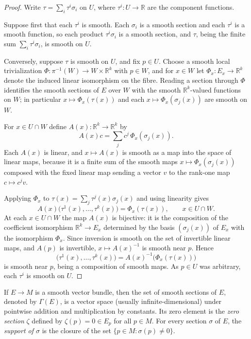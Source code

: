 \begin{proof}

Write $\tau = \sum_i \tau^i \sigma_i$ on $U$, where $\tau^i : U \to \mathbb{R}$ are the component
functions.

Suppose first that each $\tau^i$ is smooth. Each $\sigma_i$ is a smooth section and each $\tau^i$
is a smooth function, so each product $\tau^i \sigma_i$ is a smooth section, and $\tau$, being the
finite sum $\sum_i \tau^i \sigma_i$, is smooth on $U$.

Conversely, suppose $\tau$ is smooth on $U$, and fix $p \in U$. Choose a smooth local
trivialization $\Phi : \pi^{-1}(W) \to W \times \mathbb{R}^k$ with $p \in W$, and for $x \in W$ let
$\Phi_x : E_x \to \mathbb{R}^k$ denote the induced linear isomorphism on the fibre. Reading a
section through $\Phi$ identifies the smooth sections of $E$ over $W$ with the smooth
$\mathbb{R}^k$-valued functions on $W$; in particular $x \mapsto \Phi_x(\tau(x))$ and each
$x \mapsto \Phi_x(\sigma_j(x))$ are smooth on $W$.

For $x \in U \cap W$ define $A(x) : \mathbb{R}^k \to \mathbb{R}^k$ by
\[
  A(x)c = \sum_j c^j \, \Phi_x(\sigma_j(x)).
\]
Each $A(x)$ is linear, and $x \mapsto A(x)$ is smooth as a map into the space of linear maps,
because it is a finite sum of the smooth maps $x \mapsto \Phi_x(\sigma_j(x))$ composed with the
fixed linear map sending a vector $v$ to the rank-one map $c \mapsto c^j v$.

Applying $\Phi_x$ to $\tau(x) = \sum_j \tau^j(x)\sigma_j(x)$ and using linearity gives
\[
  A(x)\bigl(\tau^1(x), \ldots, \tau^k(x)\bigr) = \Phi_x(\tau(x)), \qquad x \in U \cap W .
\]
At each $x \in U \cap W$ the map $A(x)$ is bijective: it is the composition of the coefficient
isomorphism $\mathbb{R}^k \to E_x$ determined by the basis $(\sigma_j(x))$ of $E_x$ with the
isomorphism $\Phi_x$. Since inversion is smooth on the set of invertible linear maps, and
$A(p)$ is invertible, $x \mapsto A(x)^{-1}$ is smooth near $p$. Hence
\[
  \bigl(\tau^1(x), \ldots, \tau^k(x)\bigr) = A(x)^{-1}\bigl(\Phi_x(\tau(x))\bigr)
\]
is smooth near $p$, being a composition of smooth maps. As $p \in U$ was arbitrary, each $\tau^i$
is smooth on $U$.
\end{proof}

If $E \to M$ is a smooth vector bundle, then the set of smooth sections of $E$, denoted by $\Gamma(E)$, is a vector space (usually infinite-dimensional) under pointwise addition and multiplication by constants. Its zero element is the \textit{zero section} $\zeta$ defined by $\zeta(p) = 0 \in E_p$ for all $p \in M$. For every section $\sigma$ of $E$, the \textit{support of $\sigma$} is the closure of the set $\{p \in M: \sigma(p) \neq 0\}$.

